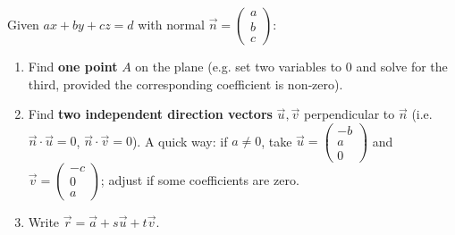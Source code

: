 \documentclass[11pt]{article}
\begin{document}
\begin{methode}
Given $ax+by+cz=d$ with normal $\vec{n}=\begin{pmatrix}a\\b\\c\end{pmatrix}$:
\begin{enumerate}
\item Find \textbf{one point} $A$ on the plane (e.g. set two variables to $0$ and solve for the third, provided the corresponding coefficient is non‑zero).
\item Find \textbf{two independent direction vectors} $\vec{u},\vec{v}$ perpendicular to $\vec{n}$ (i.e. $\vec{n}\cdot\vec{u}=0$, $\vec{n}\cdot\vec{v}=0$). A quick way: if $a\neq0$, take $\vec{u}=\begin{pmatrix}-b\\a\\0\end{pmatrix}$ and $\vec{v}=\begin{pmatrix}-c\\0\\a\end{pmatrix}$; adjust if some coefficients are zero.
\item Write $\vec{r}=\vec{a}+s\vec{u}+t\vec{v}$.
\end{enumerate}
\end{methode}
\end{document}
